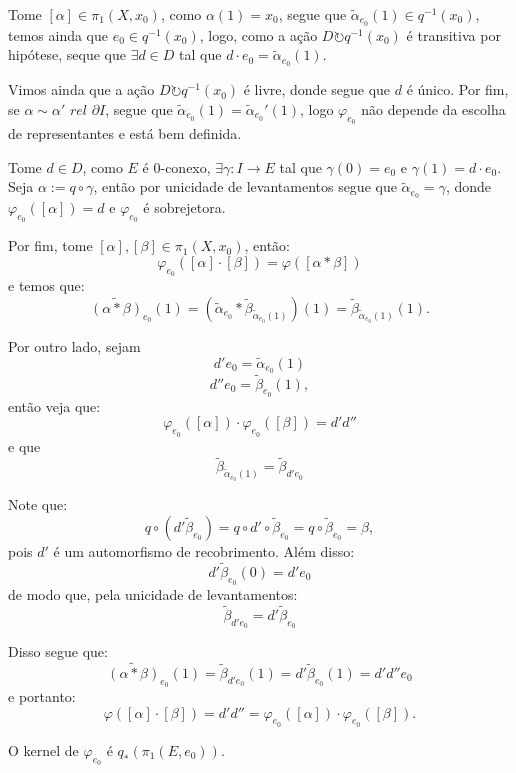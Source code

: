 \begin{dem}
    Tome $[\alpha] \in \pi_1(X, x_0)$, como $\alpha(1) = x_0$, segue que $\tilde\alpha_{e_0}(1) \in q^{-1}(x_0)$, temos ainda que $e_0 \in q^{-1}(x_0)$, logo, como a ação $D \circlearrowright q^{-1}(x_0)$ é transitiva por hipótese, seque que $\exists d \in D$ tal que $d \cdot e_0 = \tilde\alpha_{e_0}(1)$.
    
    Vimos ainda que a ação $D \circlearrowright q^{-1}(x_0)$ é livre, donde segue que $d$ é único. Por fim, se $\alpha \sim \alpha'$ $rel$ $\partial I$, segue que $\tilde\alpha_{e_0}(1) = \tilde\alpha_{e_0}'(1)$, logo $\varphi_{e_0}$ não depende da escolha de representantes e está bem definida.

    Tome $d \in D$, como $E$ é $0$-conexo, $\exists \gamma:I \longrightarrow E$ tal que $\gamma(0) = e_0$ e $\gamma(1) = d \cdot e_0$. Seja $\alpha := q \circ \gamma$, então por unicidade de levantamentos segue que $\tilde\alpha_{e_0} = \gamma$, donde $\varphi_{e_0}([\alpha]) = d$ e $\varphi_{e_0}$ é sobrejetora.

    Por fim, tome $[\alpha], [\beta] \in \pi_1(X, x_0)$, então: $$\varphi_{e_0}([\alpha] \cdot [\beta]) = \varphi([\alpha*\beta])$$ e temos que: $$\widetilde{(\alpha * \beta)}_{e_0}(1) = (\tilde\alpha_{e_0}*\tilde\beta_{\tilde\alpha_{e_0}(1)})(1) = \tilde\beta_{\tilde\alpha_{e_0}(1)}(1).$$

    Por outro lado, sejam $$d'e_0 = \tilde\alpha_{e_0}(1)$$ $$d''e_0 = \tilde\beta_{e_0}(1),$$ então veja que: $$\varphi_{e_0}([\alpha]) \cdot \varphi_{e_0}([\beta]) = d'd''$$ e que $$\tilde\beta_{\tilde\alpha_{e_0}(1)} = \tilde\beta_{d'e_0}$$

    Note que: $$q \circ (d'\tilde\beta_{e_0}) = q \circ d' \circ \tilde\beta_{e_0} = q \circ \tilde\beta_{e_0} = \beta,$$ pois $d'$ é um automorfismo de recobrimento. Além disso: $$d'\tilde\beta_{e_0}(0) = d'e_0$$ de modo que, pela unicidade de levantamentos: $$\tilde\beta_{d'e_0} = d'\tilde\beta_{e_0}$$

    Disso segue que: $$\widetilde{(\alpha * \beta)}_{e_0}(1) = \tilde\beta_{d'e_0}(1) = d'\tilde\beta_{e_0}(1) = d'd''e_0$$ e portanto: $$\varphi([\alpha]\cdot[\beta]) = d'd'' = \varphi_{e_0}([\alpha]) \cdot \varphi_{e_0}([\beta]).$$
\end{dem}

\begin{prop}
    O kernel de $\varphi_{e_0}$ é $q_*(\pi_1(E, e_0))$.
\end{prop}

